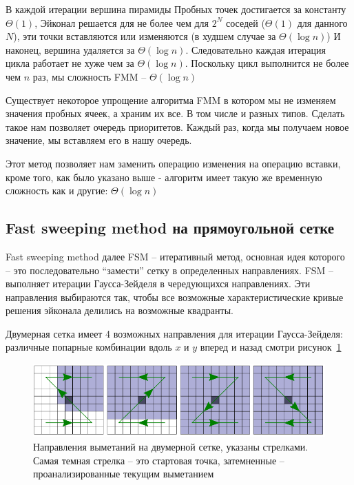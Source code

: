 В каждой итерации вершина пирамиды Пробных точек достигается за
константу $\Theta(1)$, Эйконал решается для не более чем для $2^N$
соседей ($\Theta(1)$ для данного $N$), эти точки вставляются или
изменяются (в худшем случае за $\Theta(\log n)$) И наконец, вершина
удаляется за $\Theta(\log n)$. Следовательно каждая итерация цикла
работает не хуже чем за $\Theta(\log n)$. Поскольку цикл выполнится не
более чем $n$ раз, мы сложность FMM -- $\Theta(\log n)$

Существует некоторое упрощение алгоритма FMM в котором мы не изменяем
значения пробных ячеек, а храним их все. В том числе и разных
типов. Сделать такое нам позволяет очередь приоритетов. Каждый раз,
когда мы получаем новое значение, мы вставляем его в нашу очередь.

Этот метод позволяет нам заменить операцию изменения на операцию
вставки, кроме того, как было указано выше - алгоритм имеет такую же
временную сложность как и другие: $\Theta(\log n)$

\subsection{Fast sweeping method на прямоугольной сетке}
\label{sec:fast-sweeping-method}

Fast sweeping method далее FSM -- итеративный метод, основная идея
которого -- это последовательно ``замести'' сетку в определенных
направлениях. FSM -- выполняет итерации Гаусса-Зейделя в чередующихся
направлениях. Эти направления выбираются так, чтобы все возможные
характеристические кривые решения эйконала делились на возможные квадранты.

Двумерная сетка имеет 4 возможных направления для итерации
Гаусса-Зейделя: различные попарные комбинации вдоль $x$ и $y$ вперед и
назад смотри рисунок~\ref{fig:fsm-sweeps}


\begin{figure}[H]
  \centering
  \includegraphics[width=\linewidth]{img/fsm-sweeps.png}
  \hfil \caption{Направления выметаний на двумерной сетке, указаны
    стрелками. Самая темная стрелка -- это стартовая точка,
    затемненные -- проанализированные текущим выметанием}
  \label{fig:fsm-sweeps}

\end{figure}


